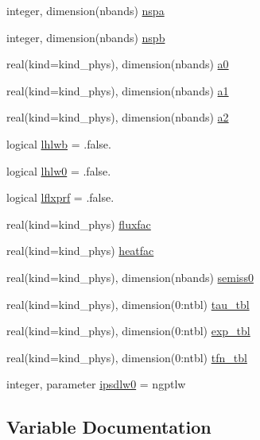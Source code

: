 \begin{DoxyCompactItemize}
integer, dimension(nbands) \hyperlink{group__module__radlw__main_ga42bbf62b5d91586f17d352af74e3c032}{nspa}
\item 
integer, dimension(nbands) \hyperlink{group__module__radlw__main_ga520be8a7f308d9e2c8e88b185170404e}{nspb}
\item 
real(kind=kind\+\_\+phys), dimension(nbands) \hyperlink{group__module__radlw__main_gae55000724e738b7a5b7be4c8cef07553}{a0}
\item 
real(kind=kind\+\_\+phys), dimension(nbands) \hyperlink{group__module__radlw__main_gaeba888f00b19a65460f3b587c60ea4a0}{a1}
\item 
real(kind=kind\+\_\+phys), dimension(nbands) \hyperlink{group__module__radlw__main_ga1b4681c9bcc9434e30fef0ca4aaa9dcd}{a2}
\item 
logical \hyperlink{group__module__radlw__main_ga40b8a6f612a53e0a768cf922aa6f73c3}{lhlwb} = .false.
\item 
logical \hyperlink{group__module__radlw__main_ga7f8818436b81efe586d83b2f03b1617f}{lhlw0} = .false.
\item 
logical \hyperlink{group__module__radlw__main_gaec461dc1a50b326daa15c57c7dc55602}{lflxprf} = .false.
\item 
real(kind=kind\+\_\+phys) \hyperlink{group__module__radlw__main_ga3c31da677e01139d9a3f1e0795a0b614}{fluxfac}
\item 
real(kind=kind\+\_\+phys) \hyperlink{group__module__radlw__main_ga75ff8e29e21f0d07684d4a09c744daec}{heatfac}
\item 
real(kind=kind\+\_\+phys), dimension(nbands) \hyperlink{group__module__radlw__main_gae3b32aa685e5f07a0003c5e919d22996}{semiss0}
\item 
real(kind=kind\+\_\+phys), dimension(0\+:ntbl) \hyperlink{group__module__radlw__main_ga9f73814ee0b1840d8c546ef341645f43}{tau\+\_\+tbl}
\item 
real(kind=kind\+\_\+phys), dimension(0\+:ntbl) \hyperlink{group__module__radlw__main_gac2f240a927351a68fc9063321a307891}{exp\+\_\+tbl}
\item 
real(kind=kind\+\_\+phys), dimension(0\+:ntbl) \hyperlink{group__module__radlw__main_ga71dcfb3c365280e100e180fd1ce939ad}{tfn\+\_\+tbl}
\item 
integer, parameter \hyperlink{group__module__radlw__main_ga9b634a4f7b06ffdd919de69a165edadc}{ipsdlw0} = ngptlw
\end{DoxyCompactItemize}


\subsection{Variable Documentation}
